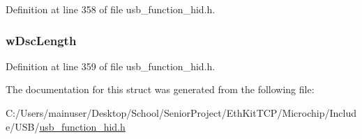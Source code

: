 Definition at line 358 of file usb\+\_\+function\+\_\+hid.\+h.

\hypertarget{struct___u_s_b___h_i_d___d_s_c___h_e_a_d_e_r_a580c2c8478960a9680c876c6226d2820}{}
\subsubsection[{w\+Dsc\+Length}]{ w\+Dsc\+Length}\label{struct___u_s_b___h_i_d___d_s_c___h_e_a_d_e_r_a580c2c8478960a9680c876c6226d2820}


Definition at line 359 of file usb\+\_\+function\+\_\+hid.\+h.



The documentation for this struct was generated from the following file\+:\begin{DoxyCompactItemize}
\item 
C\+:/\+Users/mainuser/\+Desktop/\+School/\+Senior\+Project/\+Eth\+Kit\+T\+C\+P/\+Microchip/\+Include/\+U\+S\+B/\hyperlink{usb__function__hid_8h}{usb\+\_\+function\+\_\+hid.\+h}\end{DoxyCompactItemize}
